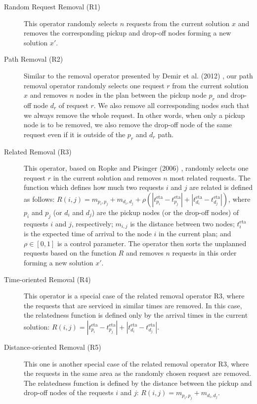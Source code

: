     \begin{description}
    		
    		\item [Random Request Removal (R1)] This operator randomly selects $n$ requests from the current solution $x$ and removes the corresponding pickup and drop-off nodes forming a new solution $x'$.
    		
    		\item [Path Removal (R2)] Similar to the removal operator presented by Demir et al. (2012) \cite{Demir2012}, our path removal operator randomly selects one request $r$ from the current solution $x$ and removes $n$ nodes in the plan between the pickup node $p_r$ and drop-off node $d_r$ of request $r$. We also remove all corresponding nodes such that we always remove the whole request. In other words, when only a pickup node is to be removed, we also remove the drop-off node of the same request even if it is outside of the $p_r$ and $d_r$ path.
    		
    		\item [Related Removal (R3)] This operator, based on Ropke and Pisinger (2006) \cite{Ropke2006}, randomly selects one request $r$ in the current solution and removes $n$ most related requests. The function which defines how much two requests $i$ and $j$ are related is defined as follows: $R(i,j) = m_{p_i, p_j} + m_{d_i, d_j} + \rho(|t^{\mathrm{eta}}_{p_i} - t^{\mathrm{eta}}_{p_j}| + |t^{\mathrm{eta}}_{d_i} - t^{\mathrm{eta}}_{d_j}|)$, where $p_i$ and $p_j$ (or $d_i$ and $d_j$) are the pickup nodes (or the drop-off nodes) of requests $i$ and $j$, respectively; $m_{i,j}$ is the distance between two nodes; $t^{\mathrm{eta}}_i$ is the expected time of arrival to the node $i$ in the current plan; and $\rho \in [0,1]$ is a control parameter. The operator then sorts the unplanned requests based on the function $R$ and removes $n$ requests in this order forming a new solution $x'$.
    		
    		\item [Time-oriented Removal (R4)] This operator is a special case of the related removal operator R3, where the requests that are serviced in similar times are removed. In this case, the relatedness function is defined only by the arrival times in the current solution: $R(i,j) = |t^{\mathrm{eta}}_{p_i} - t^{\mathrm{eta}}_{p_j}| + |t^{\mathrm{eta}}_{d_i} - t^{\mathrm{eta}}_{d_j}|$.
    		
    		\item [Distance-oriented Removal (R5)] This one is another special case of the related removal operator R3, where the requests in the same area as the randomly chosen request are removed. The relatedness function is defined by the distance between the pickup and drop-off nodes of the requests $i$ and $j$: $R(i,j) = m_{p_i, p_j} + m_{d_i, d_j}$.
    		

\end{description}
